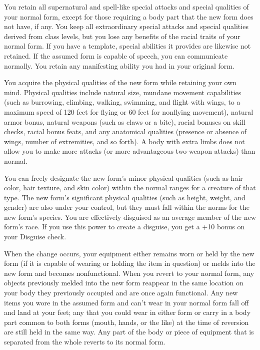 \documentclass{article}
\begin{document}
You retain all supernatural and spell-like special attacks and special qualities 
of your normal form, except for those requiring a body part that the new form does 
not have, if any. You keep all extraordinary special attacks and special qualities 
derived from class levels, but you lose any benefits of the racial traits of your 
normal form. If you have a template, special abilities it provides are likewise 
not retained. If the assumed form is capable of speech, you can communicate normally. 
You retain any manifesting ability you had in your original form.

You acquire the physical qualities of the new form while retaining your own mind. 
Physical qualities include natural size, mundane movement capabilities (such as 
burrowing, climbing, walking, swimming, and flight with wings, to a maximum speed 
of 120 feet for flying or 60 feet for nonflying movement), natural armor bonus, 
natural weapons (such as claws or a bite), racial bonuses on skill checks, racial 
bonus feats, and any anatomical qualities (presence or absence of wings, number 
of extremities, and so forth). A body with extra limbs does not allow you to make 
more attacks (or more advantageous two-weapon attacks) than normal.

You can freely designate the new form's minor physical qualities (such as hair 
color, hair texture, and skin color) within the normal ranges for a creature of 
that type. The new form's significant physical qualities (such as height, weight, 
and gender) are also under your control, but they must fall within the norms for 
the new form's species. You are effectively disguised as an average member of the 
new form's race. If you use this power to create a disguise, you get a +10 bonus 
on your Disguise check.

When the change occurs, your equipment either remains worn or held by the new form 
(if it is capable of wearing or holding the item in question) or melds into the 
new form and becomes nonfunctional. When you revert to your normal form, any objects 
previously melded into the new form reappear in the same location on your body 
they previously occupied and are once again functional. Any new items you wore 
in the assumed form and can't wear in your normal form fall off and land at your 
feet; any that you could wear in either form or carry in a body part common to 
both forms (mouth, hands, or the like) at the time of reversion are still held 
in the same way. Any part of the body or piece of equipment that is separated from 
the whole reverts to its normal form.
\end{document}
